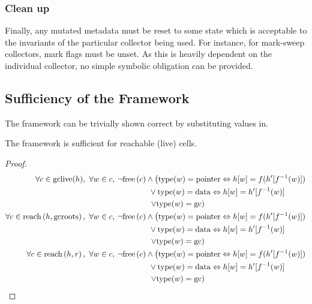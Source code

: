 \subsubsection{Clean up}
\label{sec:gc-framework-obligations-clean}

Finally, any mutated metadata must be reset to some state which is
acceptable to the invariants of the particular collector being
used. For instance, for mark-sweep collectors, mark flags must be
unset. As this is heavily dependent on the individual collector, no
simple symbolic obligation can be provided.

\subsection{Sufficiency of the Framework}
\label{sec:gc-framework-sufficiency}

The framework can be trivially shown correct by substituting values
in.

\begin{lemma}
  The framework is sufficient for reachable (live) cells.
\end{lemma}

\begin{proof}
  \begin{align*}
    \forall c \in \mathrm{gclive}(h),\ \forall w \in c,\ & \lnot\free{c}
      \land \left(\mathrm{type}(w) = \mathrm{pointer} \iff h[w] =
      f(h'[f^{-1}(w)])\right.\\
    &\quad\quad\quad\quad \lor \mathrm{type}(w) = \mathrm{data}
    \iff h[w] = h'[f^{-1}(w)]\\
    &\quad\quad\quad\quad \left.\lor \mathrm{type}(w) =
      \mathrm{gc}\right)\\
%
    \forall c \in \reach{h}{\mathrm{gcroots}},\ \forall w \in c,\ &
      \lnot\free{c} \land \left(\mathrm{type}(w) = \mathrm{pointer} \iff
      h[w] = f(h'[f^{-1}(w)])\right.\\
    &\quad\quad\quad\quad \lor \mathrm{type}(w) = \mathrm{data}
      \iff h[w] = h'[f^{-1}(w)]\\
    &\quad\quad\quad\quad \left.\lor \mathrm{type}(w) =
      \mathrm{gc}\right)\\
%
    \forall c \in \reach{h}{r},\ \forall w \in c,\ & \lnot\free{c} \land
      \left(\mathrm{type}(w) = \mathrm{pointer} \iff
      h[w] = f(h'[f^{-1}(w)])\right.\\
    &\quad\quad\quad\quad \lor \mathrm{type}(w) = \mathrm{data}
      \iff h[w] = h'[f^{-1}(w)]\\
    &\quad\quad\quad\quad \left.\lor \mathrm{type}(w) =
      \mathrm{gc}\right)
\end{align*}
\end{proof}

